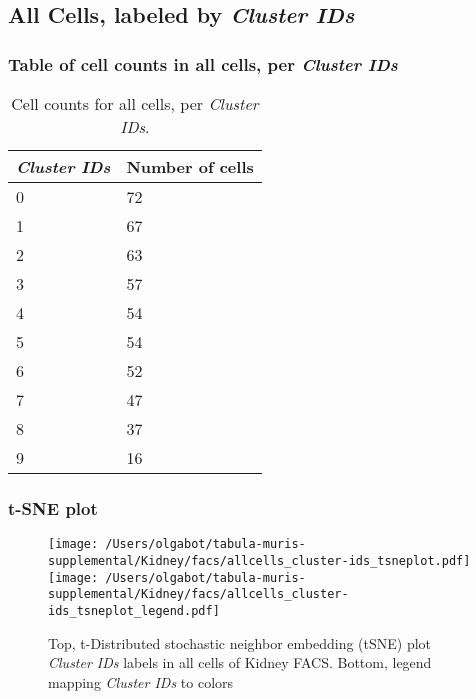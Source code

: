 \clearpage

\subsection{All Cells, labeled by \emph{Cluster IDs}}
\subsubsection{Table of cell counts in all cells, per \emph{Cluster IDs}}\begin{table}[h]
\centering
\label{my-label}
\begin{tabular}{@{}ll@{}}
\toprule

\emph{Cluster IDs}& Number of cells \\ \midrule
0 & 72 \\

1 & 67 \\

2 & 63 \\

3 & 57 \\

4 & 54 \\

5 & 54 \\

6 & 52 \\

7 & 47 \\

8 & 37 \\

9 & 16 \\
\bottomrule
\end{tabular}
\caption{Cell counts for all cells, per \emph{Cluster IDs}.}
\end{table}

\clearpage
\subsubsection{t-SNE plot}
\begin{figure}[h]
\centering
\texttt{[image: /Users/olgabot/tabula-muris-supplemental/Kidney/facs/allcells\_cluster-ids\_tsneplot.pdf]}
\texttt{[image: /Users/olgabot/tabula-muris-supplemental/Kidney/facs/allcells\_cluster-ids\_tsneplot\_legend.pdf]}
\caption{Top, t-Distributed stochastic neighbor embedding (tSNE) plot  \emph{Cluster IDs} labels in all cells of Kidney FACS. Bottom, legend mapping \emph{Cluster IDs} to colors}
\end{figure}


